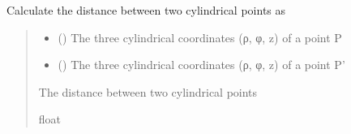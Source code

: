 \documentclass[letterpaper,10pt,english]{sphinxmanual}
\begin{document}
\begin{fulllineitems}
\label{\detokenize{generated/photon_canon.contrib.diffusion_theory:photon_canon.contrib.diffusion_theory.cylindrical_distance}}
\pysigstartsignatures
\pysiglinewithargsret
{}
{\sphinxparamcomma {}}
{}
\pysigstopsignatures
\sphinxAtStartPar
Calculate the distance between two cylindrical points as
\begin{quote}\begin{description}
\begin{itemize}
\item {} 
\sphinxAtStartPar
{} (\sphinxstyleliteralemphasis{\sphinxupquote{{[}}}\sphinxstyleliteralemphasis{\sphinxupquote{, }}\sphinxstyleliteralemphasis{\sphinxupquote{, }}\sphinxstyleliteralemphasis{\sphinxupquote{{]}}}) \textendash{} The three cylindrical coordinates (ρ, φ, z) of a point P

\item {} 
\sphinxAtStartPar
{} (\sphinxstyleliteralemphasis{\sphinxupquote{{[}}}\sphinxstyleliteralemphasis{\sphinxupquote{, }}\sphinxstyleliteralemphasis{\sphinxupquote{, }}\sphinxstyleliteralemphasis{\sphinxupquote{{]}}}) \textendash{} The three cylindrical coordinates (ρ, φ, z) of a point P’

\end{itemize}

\sphinxAtStartPar
The distance between two cylindrical points

\sphinxAtStartPar
float

\end{description}\end{quote}

\end{fulllineitems}

\end{document}
